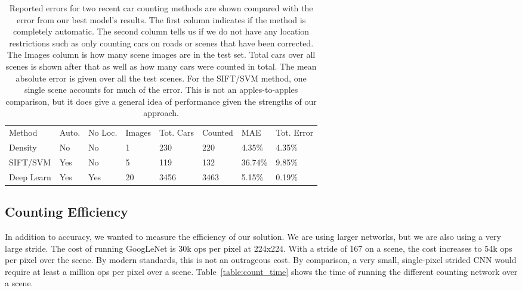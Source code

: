 \documentclass[runningheads]{llncs}
\begin{document}
\setlength{\tabcolsep}{4pt}
\begin{table}
\begin{center}
\caption{Reported errors for two recent car counting methods are shown compared with the error from our best model's results. The first column indicates if the method is completely automatic. The second column tells us if we do not have any location restrictions such as only counting cars on roads or scenes that have been corrected. The Images column is how many scene images are in the test set. Total cars over all scenes is shown after that as well as how many cars were counted in total. The mean absolute error is given over all the test scenes. For the SIFT/SVM method, one single scene accounts for much of the error. This is not an apples-to-apples comparison, but it does give a general idea of performance given the strengths of our approach.}
\label{table:count_method}
\begin{tabular}{llllllll}
\hline\noalign{\smallskip}
Method & Auto. & No Loc. & Images & Tot. Cars & Counted & MAE & Tot. Error\\
\noalign{\smallskip}
\hline
\noalign{\smallskip}
Density \cite{Arteta14} & No & No & 1 & 230 & 220 & 4.35\% & 4.35\%\\
SIFT/SVM \cite{Moranduzzo14} & Yes & No & 5 & 119 & 132 & 36.74\% & 9.85\%\\
Deep Learn & Yes & Yes & 20 & 3456 & 3463 & 5.15\% & 0.19\%\\
\hline
\end{tabular}
\end{center}
\end{table}
\setlength{\tabcolsep}{1.4pt}

\subsection{Counting Efficiency}
In addition to accuracy, we wanted to measure the efficiency of our solution. We are using larger networks, but we are also using a very large stride. The cost of running GoogLeNet is 30k ops per pixel at 224x224. With a stride of 167 on a scene, the cost increases to 54k ops per pixel over the scene. By modern standards, this is not an outrageous cost. By comparison, a very small, single-pixel strided CNN would require at least a million ops per pixel over a scene. Table~\ref{table:count_time} shows the time of running the different counting network over a scene.  
\end{document}

